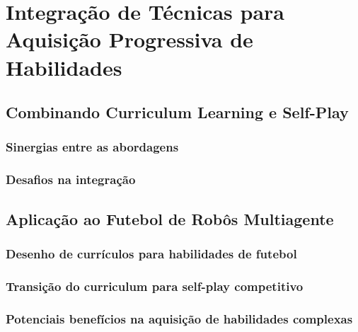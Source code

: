 \section{Integração de Técnicas para Aquisição Progressiva de Habilidades}
\label{sec:integracao}

\subsection{Combinando Curriculum Learning e Self-Play}
\label{subsec:combinacao}

\subsubsection{Sinergias entre as abordagens}
\label{subsubsec:sinergias}

\subsubsection{Desafios na integração}
\label{subsubsec:desafios_integracao}

\subsection{Aplicação ao Futebol de Robôs Multiagente}
\label{subsec:aplicacao_futebol}

\subsubsection{Desenho de currículos para habilidades de futebol}
\label{subsubsec:curriculos_futebol}

\subsubsection{Transição do curriculum para self-play competitivo}
\label{subsubsec:transicao_self_play}

\subsubsection{Potenciais benefícios na aquisição de habilidades complexas}
\label{subsubsec:beneficios_aquisicao}
